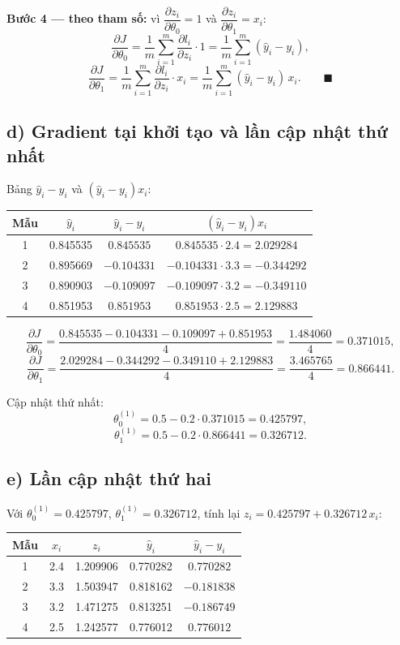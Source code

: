 \documentclass[a4paper,12pt]{article}
\begin{document}
\textbf{Bước 4 — theo tham số:} vì $\dfrac{\partial z_i}{\partial\theta_0} = 1$ và
$\dfrac{\partial z_i}{\partial\theta_1} = x_i$:
\[ \frac{\partial J}{\partial\theta_0}
= \frac{1}{m}\sum_{i=1}^{m}\frac{\partial l_i}{\partial z_i}\cdot 1
= \frac{1}{m}\sum_{i=1}^{m}(\hat{y}_i - y_i), \]
\[ \frac{\partial J}{\partial\theta_1}
= \frac{1}{m}\sum_{i=1}^{m}\frac{\partial l_i}{\partial z_i}\cdot x_i
= \frac{1}{m}\sum_{i=1}^{m}(\hat{y}_i - y_i)\,x_i. \qquad \blacksquare \]

\subsection*{d) Gradient tại khởi tạo và lần cập nhật thứ nhất}

Bảng $\hat{y}_i - y_i$ và $(\hat{y}_i - y_i)x_i$:
\begin{center}
\begin{tabular}{|c|c|c|c|}
\hline
Mẫu & $\hat{y}_i$ & $\hat{y}_i - y_i$ & $(\hat{y}_i-y_i)x_i$ \\
\hline
1 & 0.845535 & $0.845535$ & $0.845535\cdot 2.4 = 2.029284$ \\
2 & 0.895669 & $-0.104331$ & $-0.104331\cdot 3.3 = -0.344292$ \\
3 & 0.890903 & $-0.109097$ & $-0.109097\cdot 3.2 = -0.349110$ \\
4 & 0.851953 & $0.851953$ & $0.851953\cdot 2.5 = 2.129883$ \\
\hline
\end{tabular}
\end{center}

\[ \frac{\partial J}{\partial\theta_0}
= \frac{0.845535-0.104331-0.109097+0.851953}{4} = \frac{1.484060}{4} = 0.371015, \]
\[ \frac{\partial J}{\partial\theta_1}
= \frac{2.029284-0.344292-0.349110+2.129883}{4} = \frac{3.465765}{4} = 0.866441. \]

Cập nhật thứ nhất:
\[ \theta_0^{(1)} = 0.5 - 0.2\cdot 0.371015 = 0.425797, \]
\[ \theta_1^{(1)} = 0.5 - 0.2\cdot 0.866441 = 0.326712. \]

\subsection*{e) Lần cập nhật thứ hai}

Với $\theta_0^{(1)} = 0.425797$, $\theta_1^{(1)} = 0.326712$, tính lại
$z_i = 0.425797 + 0.326712\,x_i$:
\begin{center}
\begin{tabular}{|c|c|c|c|c|}
\hline
Mẫu & $x_i$ & $z_i$ & $\hat{y}_i$ & $\hat{y}_i - y_i$ \\
\hline
1 & 2.4 & 1.209906 & 0.770282 & $0.770282$ \\
2 & 3.3 & 1.503947 & 0.818162 & $-0.181838$ \\
3 & 3.2 & 1.471275 & 0.813251 & $-0.186749$ \\
4 & 2.5 & 1.242577 & 0.776012 & $0.776012$ \\
\hline
\end{tabular}
\end{center}
\end{document}
